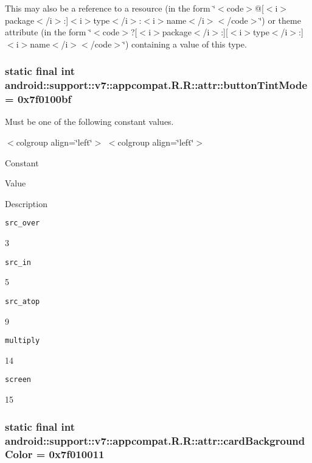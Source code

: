 This may also be a reference to a resource (in the form \char`\"{}$<$code$>$@\mbox{[}$<$i$>$package$<$/i$>$:\mbox{]}$<$i$>$type$<$/i$>$:$<$i$>$name$<$/i$>$$<$/code$>$\char`\"{}) or theme attribute (in the form \char`\"{}$<$code$>$?\mbox{[}$<$i$>$package$<$/i$>$:\mbox{]}\mbox{[}$<$i$>$type$<$/i$>$:\mbox{]}$<$i$>$name$<$/i$>$$<$/code$>$\char`\"{}) containing a value of this type. \hypertarget{classandroid_1_1support_1_1v7_1_1appcompat_1_1_r_1_1attr_d5f8e37859d659113e7c73300c55fc2e}{
\subsubsection[{buttonTintMode}]{\setlength{\rightskip}{0pt plus 5cm}static final int android::support::v7::appcompat.R.R::attr::buttonTintMode = 0x7f0100bf}}
\label{classandroid_1_1support_1_1v7_1_1appcompat_1_1_r_1_1attr_d5f8e37859d659113e7c73300c55fc2e}


Must be one of the following constant values. \begin{TabularC}{0}
\hline
\end{TabularC}
$<$colgroup align=\char`\"{}left\char`\"{}$>$ $<$colgroup align=\char`\"{}left\char`\"{}$>$ 

Constant

Value

Description 

{\tt src\_\-over}

3

{\tt src\_\-in}

5

{\tt src\_\-atop}

9

{\tt multiply}

14

{\tt screen}

15\hypertarget{classandroid_1_1support_1_1v7_1_1appcompat_1_1_r_1_1attr_d6cb0abb2cb9d9f89ea1c3611845b569}{
\subsubsection[{cardBackgroundColor}]{\setlength{\rightskip}{0pt plus 5cm}static final int android::support::v7::appcompat.R.R::attr::cardBackgroundColor = 0x7f010011}}
\label{classandroid_1_1support_1_1v7_1_1appcompat_1_1_r_1_1attr_d6cb0abb2cb9d9f89ea1c3611845b569}


